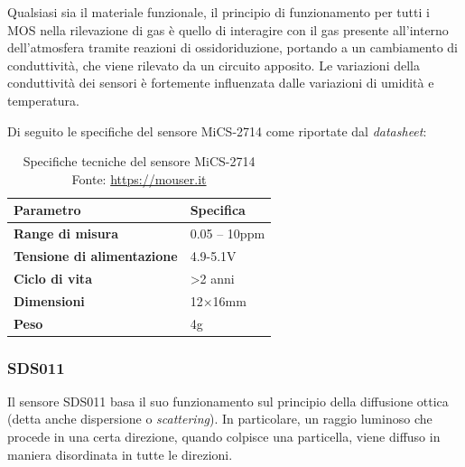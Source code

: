 Qualsiasi sia il materiale funzionale, il principio di funzionamento per tutti i MOS nella rilevazione di gas è quello di interagire con il gas presente all’interno dell’atmosfera tramite reazioni di ossidoriduzione, portando a un cambiamento di conduttività, che viene rilevato da un circuito apposito. Le variazioni della conduttività dei sensori è fortemente influenzata dalle variazioni di umidità e temperatura. \cite{relazione_alice}

Di seguito le specifiche del sensore MiCS-2714 come riportate dal \textit{datasheet}:

\begin{table}[H]
    \footnotesize
    \centering
    \begin{tabular}{|l|l|}
    \hline
        \textbf{Parametro} & \textbf{Specifica} \\ \hline
        \textbf{Range di misura} & 0.05 – 10ppm \\ \hline
        \textbf{Tensione di alimentazione} & 4.9-5.1V \\ \hline
        \textbf{Ciclo di vita} & >2 anni \\ \hline
        \textbf{Dimensioni} & 12×16mm \\ \hline
        \textbf{Peso} & 4g \\ \hline
    \end{tabular}
    \captionsetup{justification=centering}
    \caption{Specifiche tecniche del sensore MiCS-2714\\Fonte: \url{https://mouser.it}}
    \label{fig:mics-specifiche}
\end{table}

\subsubsection{SDS011}\label{sensore-pm}
Il sensore SDS011 basa il suo funzionamento sul principio della diffusione ottica (detta anche dispersione o \textit{scattering}). In particolare, un raggio luminoso che procede in una certa direzione, quando colpisce una particella, viene diffuso in maniera disordinata in tutte le direzioni. \cite{sds}

